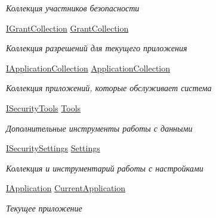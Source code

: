 \begin{DoxyCompactItemize}
\begin{DoxyCompactList}\small\item\em Коллекция участников безопасности \end{DoxyCompactList}\item 
\hyperlink{interface_security_1_1_interfaces_1_1_collections_1_1_i_grant_collection}{I\+Grant\+Collection} \hyperlink{interface_security_1_1_interfaces_1_1_i_security_a5e7e7b325519e96ad8b821465fa8e452}{Grant\+Collection}
\begin{DoxyCompactList}\small\item\em Коллекция разрешений для текущего приложения \end{DoxyCompactList}\item 
\hyperlink{interface_security_1_1_interfaces_1_1_collections_1_1_i_application_collection}{I\+Application\+Collection} \hyperlink{interface_security_1_1_interfaces_1_1_i_security_a290a992b30692e03bdb7e68d10105e52}{Application\+Collection}
\begin{DoxyCompactList}\small\item\em Коллекция приложений, которые обслуживает система \end{DoxyCompactList}\item 
\hyperlink{interface_security_1_1_interfaces_1_1_i_security_tools}{I\+Security\+Tools} \hyperlink{interface_security_1_1_interfaces_1_1_i_security_a24a85144bad620f24ba7c956a4adb9a7}{Tools}
\begin{DoxyCompactList}\small\item\em Дополнительные инструменты работы с данными \end{DoxyCompactList}\item 
\hyperlink{interface_security_1_1_interfaces_1_1_i_security_settings}{I\+Security\+Settings} \hyperlink{interface_security_1_1_interfaces_1_1_i_security_a3aa560f3ce4b1ef441f316f861171198}{Settings}
\begin{DoxyCompactList}\small\item\em Коллекция и инструментарий работы с настройками \end{DoxyCompactList}\item 
\hyperlink{interface_security_1_1_interfaces_1_1_model_1_1_i_application}{I\+Application} \hyperlink{interface_security_1_1_interfaces_1_1_i_security_a684f78876930b83d2324fa420bd6cba6}{Current\+Application}
\begin{DoxyCompactList}\small\item\em Текущее приложение \end{DoxyCompactList}\end{DoxyCompactItemize}


